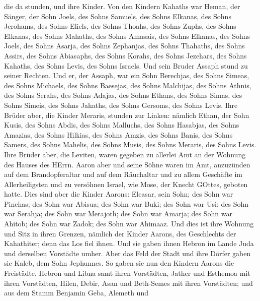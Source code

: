 die da stunden, und ihre Kinder. Von den Kindern Kahaths war Heman, der
Sänger, der Sohn Joels, des Sohns Samuels,  des Sohns
Elkanas, des Sohns Jerohams, des Sohns Eliels, des Sohns Thoahs,
 des Sohns Zuphs, des Sohns Elkanas, des Sohns Mahaths, des
Sohns Amasais,  des Sohns Elkanas, des Sohns Joels, des
Sohns Asarja, des Sohns Zephanjas,  des Sohns Thahaths, des
Sohns Assirs, des Sohns Abiasaphs, des Sohns Korahs,  des
Sohns Jezehars, des Sohns Kahaths, des Sohns Levis, des Sohns Israels.
 Und sein Bruder Assaph stund zu seiner Rechten. Und er,
der Assaph, war ein Sohn Berechjas, des Sohns Simeas,  des
Sohns Michaels, des Sohns Baesejas, des Sohns Malchijas, 
des Sohns Athnis, des Sohns Serahs, des Sohns Adajas,  des
Sohns Ethans, des Sohns Simas, des Sohns Simeis,  des Sohns
Jahaths, des Sohns Gersoms, des Sohns Levis.  Ihre Brüder
aber, die Kinder Meraris, stunden zur Linken: nämlich Ethan, der Sohn
Kusis, des Sohns Abdis, des Sohns Malluchs,  des Sohns
Hasabjas, des Sohns Amazias, des Sohns Hilkias,  des Sohns
Amzis, des Sohns Banis, des Sohns Samers,  des Sohns
Mahelis, des Sohns Musis, des Sohns Meraris, des Sohns Levis.
 Ihre Brüder aber, die Leviten, waren gegeben zu allerlei
Amt an der Wohnung des Hauses des HErrn.  Aaron aber und
seine Söhne waren im Amt, anzuzünden auf dem Brandopferaltar und auf dem
Räuchaltar und zu allem Geschäfte im Allerheiligsten und zu versöhnen
Israel, wie Mose, der Knecht GOttes, geboten hatte.  Dies
sind aber die Kinder Aarons: Eleasar, sein Sohn; des Sohn war Pinehas;
des Sohn war Abisua;  des Sohn war Buki; des Sohn war Usi;
des Sohn war Serahja;  des Sohn war Merajoth; des Sohn war
Amarja; des Sohn war Ahitob;  des Sohn war Zadok; des Sohn
war Ahimaaz.  Und dies ist ihre Wohnung und Sitz in ihren
Grenzen, nämlich der Kinder Aarons, des Geschlechts der Kahathiter; denn
das Los fiel ihnen.  Und sie gaben ihnen Hebron im Lande
Juda und derselben Vorstädte umher.  Aber das Feld der
Stadt und ihre Dörfer gaben sie Kaleb, dem Sohn Jephunnes. 
So gaben sie nun den Kindern Aarons die Freistädte, Hebron und Libna
samt ihren Vorstädten, Jather und Esthemoa mit ihren Vorstädten,
 Hilen, Debir,  Asan und Beth-Semes mit ihren
Vorstädten;  und aus dem Stamm Benjamin Geba, Alemeth und
